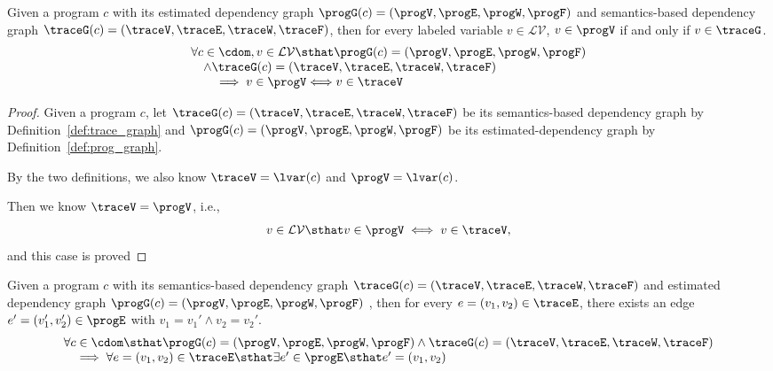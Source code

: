 \begin{lem}
	\label{lem:vertex_map}
	Given a program $c$ with its
	estimated dependency graph $\progG({c}) = (\progV, \progE, \progW, \progF)$
	and 
	semantics-based dependency graph $\traceG({c}) = (\traceV, \traceE, \traceW, \traceF)$,
	then for every labeled variable $v \in \mathcal{LV}$,
	$v \in \progV$ if and only if $v \in \traceG$.
	\[
	\begin{array}{l}
	\forall c \in \cdom , v \in \mathcal{LV} 
	\sthat  
	\progG({c}) = (\progV, \progE, \progW, \progF)
	\\ \quad
	\land 
	\traceG({c}) = (\traceV, \traceE, \traceW, \traceF)
	\\ \qquad
	\implies
	v \in \progV \Longleftrightarrow v \in \traceV
	\end{array}
	\]
	\end{lem}
\begin{proof}
Given a program ${c}$, let $\traceG({c}) = (\traceV, \traceE, \traceW, \traceF)$ 
be its semantics-based dependency graph by Definition~\ref{def:trace_graph} and $\progG({c}) = (\progV, \progE, \progW, \progF)$ be its estimated-dependency graph
by Definition~\ref{def:prog_graph}.

By the two definitions, we also know 
$\traceV  = \lvar(c)$ and $\progV = \lvar(c)$.

Then we know $\traceV  = \progV$, i.e., 
$$v \in \mathcal{LV}  \sthat v \in \progV \iff v \in \traceV,$$
and this case is proved
\end{proof}
%
	\begin{lem}
	\label{lem:edge_map}
	Given a program $c$ with its
	semantics-based dependency graph $\traceG({c}) = (\traceV, \traceE, \traceW, \traceF)$
	and 
	estimated dependency graph $\progG({c}) = (\progV, \progE, \progW, \progF)$	,
	then for every $e = (v_1, v_2) \in \traceE$, there exists an edge 
	$e' = (v_1', v_2') \in \progE$ with 
	$v_1 = v_1' \land v_2 = v_2'$.
	\[
	\begin{array}{l}
	\forall c \in \cdom \sthat 
	 \progG({c}) = (\progV, \progE, \progW, \progF)
	\land 
	\traceG({c}) = (\traceV, \traceE, \traceW, \traceF)
	\\ \quad
	\implies
	\forall e = (v_1, v_2) \in \traceE
	\sthat  
	\exists e' \in \progE \sthat  e' = (v_1, v_2)
	\end{array}
	\]
	\end{lem}

